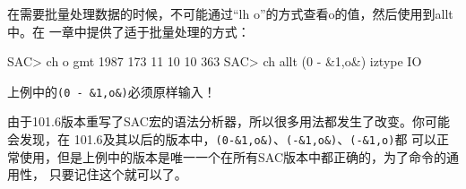 在需要批量处理数据的时候，不可能通过``lh o''的方式查看o的值，然后使用到allt中。在
一章中提供了适于批量处理的方式：
\begin{SACCode}
SAC> ch o gmt 1987 173 11 10 10 363 
SAC> ch allt (0 - &1,o&) iztype IO      
\end{SACCode}

\begin{Tips}
上例中的\lstinline{(0 - &1,o&)}必须原样输入！
    
由于101.6版本重写了SAC宏的语法分析器，所以很多用法都发生了改变。你可能会发现，在
101.6及其以后的版本中，\lstinline{(0-&1,o&)}、\lstinline{(-&1,o&)}、\lstinline{(-&1,o)}都
可以正常使用，但是上例中的版本是唯一一个在所有SAC版本中都正确的，为了命令的通用性，
只要记住这个就可以了。
\end{Tips}
